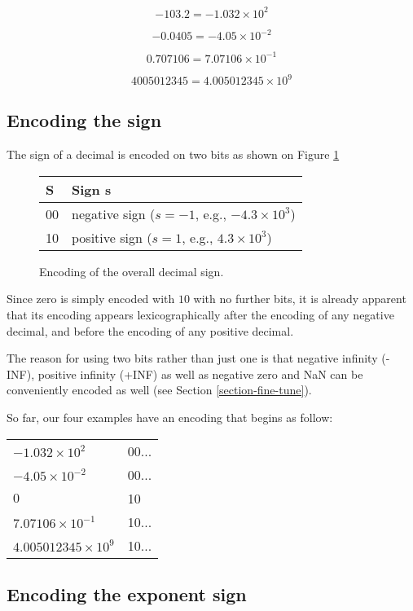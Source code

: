 \documentclass{acm_proc_article-sp}
\begin{document}
$$-103.2 = - 1.032 \times 10^2$$

$$-0.0405 = -4.05 \times 10^{-2}$$

$$0.707106 = 7.07106 \times 10^{-1}$$

$$4005012345 = 4.005012345 \times 10^9$$


\subsection{Encoding the sign}

The sign of a decimal is encoded on two bits as shown on Figure \ref{figure-sign}

\begin{figure}
\caption{Encoding of the overall decimal sign.}
\label{figure-sign}
\center
\begin{tabular}{|l|l|}
\hline
S & Sign s \\
\hline
00 &  negative sign ($s=-1$, e.g., $-4.3\times10^3$)\\
\hline
10 & positive sign ($s=1$, e.g., $4.3\times10^3$)\\
\hline
\end{tabular}
\end{figure}

Since zero is simply encoded with $10$ with no further bits, it is already apparent that its encoding appears lexicographically after the encoding of any negative decimal, and before the encoding of any positive decimal.

The reason for using two bits rather than just one is that negative infinity (-INF), positive infinity (+INF) as well as negative zero and NaN can be conveniently encoded as well (see Section \ref{section-fine-tune}).

So far, our four examples have an encoding that begins as follow:

\begin{tabular}{l|l}
$- 1.032 \times 10^2$ & 00... \\

$-4.05 \times 10^{-2}$ & 00... \\

$0$ & 10 \\

$7.07106 \times 10^{-1}$ & 10... \\

$4.005012345 \times 10^9$ & 10...\\
\end{tabular}
\subsection{Encoding the exponent sign}
\end{document}
